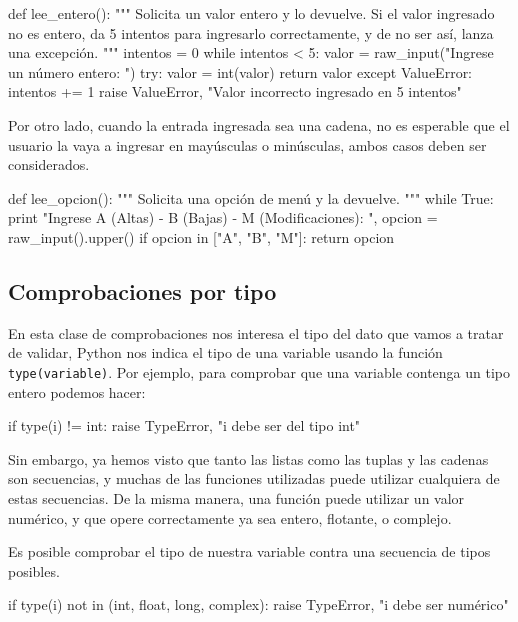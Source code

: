 \begin{codigo-python-sn}
def lee_entero():
    """ Solicita un valor entero y lo devuelve.
        Si el valor ingresado no es entero, da 5 intentos para ingresarlo
        correctamente, y de no ser así, lanza una excepción. """
    intentos = 0
    while intentos < 5:
        valor = raw_input("Ingrese un número entero: ")
        try:
            valor = int(valor)
            return valor
        except ValueError:
            intentos += 1
    raise ValueError, "Valor incorrecto ingresado en 5 intentos"
\end{codigo-python-sn}

Por otro lado, cuando la entrada ingresada sea una cadena, no es esperable que
el usuario la vaya a ingresar en mayúsculas o minúsculas, ambos casos deben
ser considerados.

\begin{codigo-python-sn}
def lee_opcion():
    """ Solicita una opción de menú y la devuelve. """
    while True:
        print "Ingrese A (Altas) - B (Bajas) - M (Modificaciones): ",
        opcion = raw_input().upper()
        if opcion in ["A", "B", "M"]:
            return opcion
\end{codigo-python-sn}

\subsection{Comprobaciones por tipo}

En esta clase de comprobaciones nos interesa el tipo del dato que vamos a
tratar de validar, Python nos indica el tipo de una variable usando la
función \lstinline!type(variable)!. Por ejemplo, para comprobar que una
variable contenga un tipo entero podemos hacer:

\begin{codigo-python-sn}
if type(i) != int:
	raise TypeError, "i debe ser del tipo int"
\end{codigo-python-sn}

Sin embargo, ya hemos visto que tanto las listas como las tuplas y las
cadenas son secuencias, y muchas de las funciones utilizadas puede utilizar
cualquiera de estas secuencias. De la misma manera, una función puede
utilizar un valor numérico, y que opere correctamente ya sea entero,
flotante, o complejo.

Es posible comprobar el tipo de nuestra variable contra una secuencia de
tipos posibles.

\begin{codigo-python-sn}
if type(i) not in (int, float, long, complex):
	raise TypeError, "i debe ser numérico"
\end{codigo-python-sn}


